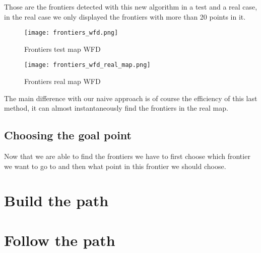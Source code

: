 Those are the frontiers detected with this new algorithm in a test and a real case, in the real case we only displayed the frontiers with more than 20 points in it.

\FloatBarrier
\begin{figure}
    \centering\texttt{[image: frontiers\_wfd.png]}
    \label{fig:frontiers_wfd}
    \caption{Frontiers test map WFD}
\end{figure}
\FloatBarrier
\begin{figure}
    \centering\texttt{[image: frontiers\_wfd\_real\_map.png]}
    \label{fig:frontiers_wfd_real_map}
    \caption{Frontiers real map WFD}
\end{figure}
\FloatBarrier

The main difference with our naive approach is of course the efficiency of this last method, it can almost instantaneously find the frontiers in the real map.

\subsection{Choosing the goal point}

Now that we are able to find the frontiers we have to first choose which frontier we want to go to and then what point in this frontier we should choose.

\section{Build the path}

\section{Follow the path}

